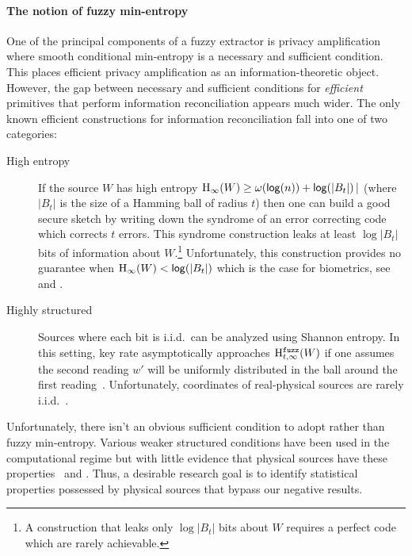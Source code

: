 \paragraph{The notion of fuzzy min-entropy}
One of the principal components of a fuzzy extractor is privacy amplification where smooth conditional min-entropy is a necessary and sufficient condition.  This places efficient privacy amplification as an information-theoretic object.   However, the gap between necessary and sufficient conditions for \emph{efficient} primitives that perform information reconciliation appears much wider. The only known efficient constructions for information reconciliation fall into one of two categories:
\begin{description}
\item[High entropy] If the source $W$ has high entropy $\mathrm{H}_\infty(W)\ge \omega(\mathsf{log}\!\left(n\right)) + \mathsf{log}\!\left(|B_t|\right)|$ (where $|B_t|$ is the size of a Hamming ball of radius $t$) then one can build a good secure sketch by writing down the syndrome of an error correcting code which corrects $t$ errors.  This syndrome construction  leaks at least $\log{|B_t|}$ bits of information about $W$.\footnote{A construction that leaks only $\log{|B_t|}$ bits about $W$ requires a perfect code which are rarely achievable.}  Unfortunately, this construction provides no guarantee when $\mathrm{H}_\infty(W)< \mathsf{log}\!\left(|B_t|\right)$ which is the case for biometrics, see \cite[Proposition 1]{canetti2021reusable} and \cite[Introduction]{simhadri2019cryptographic}.
\item[Highly structured] Sources where each bit is i.i.d.\ can be analyzed using Shannon entropy.  In this setting, key rate asymptotically approaches $\mathrm{H}^{\mathtt{fuzz}}_{t,\infty}(W)$ if one assumes the second reading $w'$ will be uniformly distributed in the ball around the first reading~\cite[Theorem 2]{tuyls2004capacity}.  Unfortunately, coordinates of real-physical sources are rarely i.i.d.~\cite{daugman2004}.
\end{description}

Unfortunately, there isn't an obvious sufficient condition to adopt
rather than fuzzy min-entropy.  Various weaker structured conditions
have been used in the computational regime but with little evidence
that physical sources have these properties~\cite[Figure
1]{demarest2021code} and \cite{simhadri2019cryptographic}. Thus, a desirable
research goal is to identify statistical properties possessed by physical
sources that bypass our negative results.

